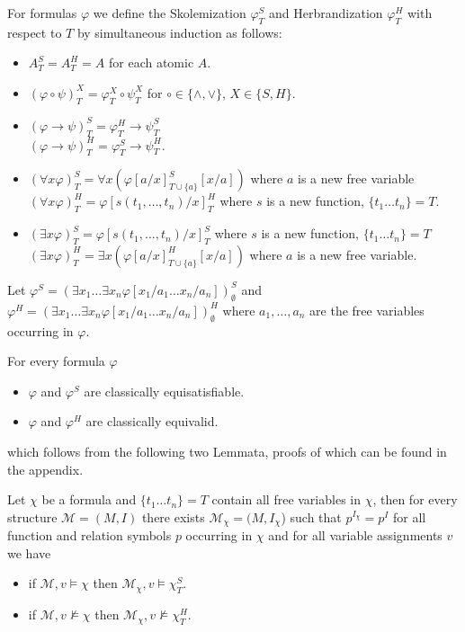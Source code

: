 \documentclass[a4paper,UKenglish,cleveref, autoref, thm-restate]{lipics-v2021}
\begin{document}
\begin{definition}
	For formulas $\varphi$ we define the Skolemization $\varphi^S_T$ and Herbrandization $\varphi^H_T$ with respect to $T$ by simultaneous induction as follows:
	\begin{itemize}
		\item $A^S_T = A^H_T = A$ for each atomic $A$.
		\item $(\varphi\circ\psi)^X_T = \varphi^X_T\circ\psi^X_T$ for $\circ\in\{\wedge, \vee\}$, $X\in\{S, H\}$.
		\item $(\varphi\to\psi)^S_T = \varphi^H_T\to \psi^S_T$\\$(\varphi\to\psi)^H_T = \varphi^S_T\to\psi^H_T$.
		\item $(\forall x\varphi)^S_T = \forall x(\varphi[a/x]^S_{T\cup\{a\}}[x/a])$ where $a$ is a new free variable\\$(\forall x\varphi)^H_T = \varphi[s(t_1,\dots,t_n)/x]^H_T$ where $s$ is a new function, $\{t_1\dots t_n\} = T$.
		\item $(\exists x\varphi)^S_T = \varphi[s(t_1,\dots,t_n)/x]^S_T$ where $s$ is a new function, $\{t_1\dots t_n\} = T$\\$(\exists x\varphi)^H_T = \exists x(\varphi[a/x]^H_{T\cup\{a\}}[x/a])$ where $a$ is a new free variable.
	\end{itemize}
	Let $\varphi^S = (\exists x_1\dots\exists x_n \varphi[x_1/a_1\dots x_n/a_n])^S_\emptyset$ and $\varphi^H = (\exists x_1\dots\exists x_n \varphi[x_1/a_1\dots x_n/a_n])^H_\emptyset$ where $a_1,\dots,a_n$ are the free variables occurring in $\varphi$.
\end{definition}

\begin{theorem}For every formula $\varphi$
	\begin{itemize}
		\item $\varphi$ and $\varphi^S$ are classically equisatisfiable.
		\item $\varphi$ and $\varphi^H$ are classically equivalid.
	\end{itemize}
\end{theorem}

which follows from the following two Lemmata, proofs of which can be found in the appendix.

\begin{lemma}\label{ap1}
	Let $\chi$ be a formula and $\{t_1\dots t_n\} = T$ contain all free variables in $\chi$, then for every structure $\mathcal M = (M, I)$ there exists $\mathcal M_\chi = (M, I_\chi$) such that $p^{I_{\chi}} = p^I$ for all function and relation symbols $p$ occurring in $\chi$ and for all variable assignments $v$ we have
	\begin{itemize}
		\item if $\mathcal M, v\models\chi$ then $\mathcal M_\chi, v\models\chi^S_T$.
		\item if $\mathcal M, v\not\models\chi$ then $\mathcal M_\chi, v\not\models\chi^H_T$.
	\end{itemize}
\end{lemma}
\end{document}
